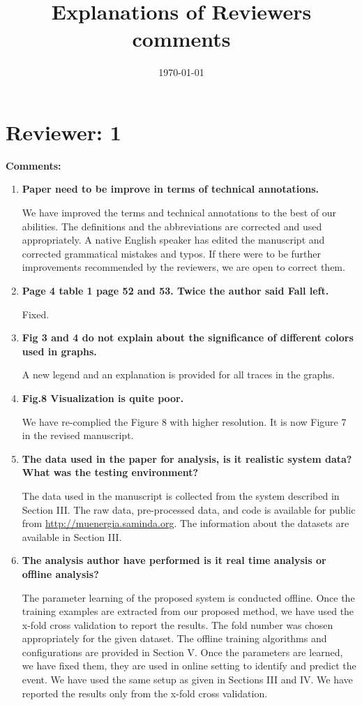 \documentclass[12pt]{article}
\title{Explanations of Reviewers comments}
\date{\today}
\begin{document}
\maketitle

\section*{Reviewer: 1}


\textbf{Comments:}

\begin{enumerate}

\item \textbf{Paper need to be improve in terms of technical annotations.}

We have improved the terms and technical annotations to the best of our abilities. The 
definitions and the abbreviations are corrected and used appropriately.  A native 
English 
speaker has edited the manuscript and corrected  grammatical mistakes and typos.  
If there 
were to be further improvements recommended by the reviewers, we are open to correct 
them. 

\item \textbf{Page 4 table 1 page 52 and 53. Twice the author said Fall left.}

Fixed.

\item \textbf{Fig 3 and 4 do not explain about the significance of different colors used 
in 
graphs.}

A new legend and an explanation is provided for all traces in the graphs. 

\item \textbf{Fig.8 Visualization is quite poor.}

We have re-complied the Figure 8 with higher resolution. It is now Figure 7 in the 
revised manuscript.   

\item \textbf{The data used in the paper for analysis, is it realistic system data? What 
was the testing environment?}

The data used in the manuscript is collected from the system described in Section III. 
The 
raw data, pre-processed data, and code is available for public from 
\url{http://muenergia.saminda.org}. The information about the datasets are available in 
Section III. 

\item \textbf{The analysis author have performed is it real time analysis or offline 
analysis?}

The parameter learning of the proposed system is conducted offline. Once the training 
examples are extracted from our proposed method, we have used the x-fold cross validation 
to report the results. The fold number was chosen appropriately for the given dataset. 
The offline training algorithms and configurations are provided in Section V. Once the 
parameters are learned, we have fixed them, they are used in online setting to identify 
and predict the event. We have used the same setup as given in Sections III and IV. We 
have reported the results only from the x-fold cross validation.  

\end{enumerate}
\end{document}
